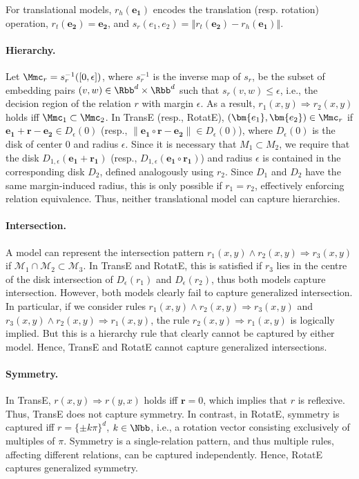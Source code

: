 \documentclass{article}
\begin{document}
For translational models, $r_h(\bm{e_1})$ encodes the translation (resp. rotation) operation, ${r_t(\bm{e_2}) = \bm{e_2}}$, and ${s_r(e_1, e_2) = \left\Vert r_t(\bm{e_2}) - r_h(\bm{e_1})\right\Vert}$.

\paragraph{Hierarchy.} Let $\Mmc_r = s_r^{-1}([0,\epsilon])$, where $s_r^{-1}$ is the inverse map of $s_r$, be the subset of embedding pairs $(v,w) \in \Rbb^d \times \Rbb^d$ such that $s_r(v, w) \leq \epsilon$, i.e., the decision region of the relation $r$ with margin $\epsilon$. 
As a result, $r_1(x,y) \Rightarrow r_2(x,y)$ holds iff  $\mathcal \Mmc_1 \subset \Mmc_2$. In TransE (resp., RotatE),  $(\bm {e_1}, \bm{e_2}) \in \mathcal \Mmc_r$  if $\bm {e_1}+\bm r - \bm {e_2} \in D_{\epsilon}(0)$ (resp., $\|  \bm {e_1} \circ \bm{r} -  \bm {e_2} \| \in D_{\epsilon}(0)$), where $D_\epsilon(0)$ is the disk of center $0$ and radius $\epsilon$. 
Since it is necessary that $M_1 \subset M_2$,  we require that the disk $D_{1,\epsilon}(\bm {e_1}+\bm {r_1})$ (resp., $D_{1,\epsilon}(\bm {e_1}\circ \bm {r_1})$) and radius $\epsilon$ is contained in the corresponding disk $D_2$, defined analogously using $r_2$. Since $D_1$ and $D_2$ have the same margin-induced radius, this is only possible if $r_1 = r_2$, effectively enforcing relation equivalence. Thus, neither translational model can capture hierarchies.

\paragraph{Intersection.} A model can represent the intersection pattern $r_1(x,y) \land r_2(x,y) \Rightarrow r_3(x,y)$ if $\mathcal M_{1} \cap \mathcal M_{2} \subset \mathcal M_{3}$. In TransE and RotatE, this is satisfied if $r_3$ lies in the centre of the disk intersection of $D_{\epsilon}(r_1)$ and $D_{\epsilon}(r_2)$, thus both models capture intersection. However, both models clearly fail to capture generalized intersection. In particular, if we consider rules ${r_1(x,y) \land r_2(x,y) \Rightarrow r_3(x,y)}$ and ${r_3(x,y) \land r_2(x,y) \Rightarrow r_1(x,y)}$, the rule ${r_2(x,y) \Rightarrow r_1(x,y)}$ is logically implied. But this is a hierarchy rule that clearly cannot be captured by either model. Hence, TransE and RotatE cannot capture generalized intersections.  


\paragraph{Symmetry.} In TransE, $r(x,y) \Rightarrow r(y,x)$ holds iff $\bm{r} = 0$, which implies that $r$ is reflexive. Thus, TransE does not capture symmetry. 
In contrast, in RotatE, symmetry is captured iff ${r = \{\pm k\pi\}^d}$, ${k \in \Nbb}$, i.e., a rotation vector consisting exclusively of multiples of $\pi$. Symmetry is a single-relation pattern, and thus multiple rules, affecting different relations, can be captured independently. Hence, RotatE captures generalized symmetry. 
\end{document}
